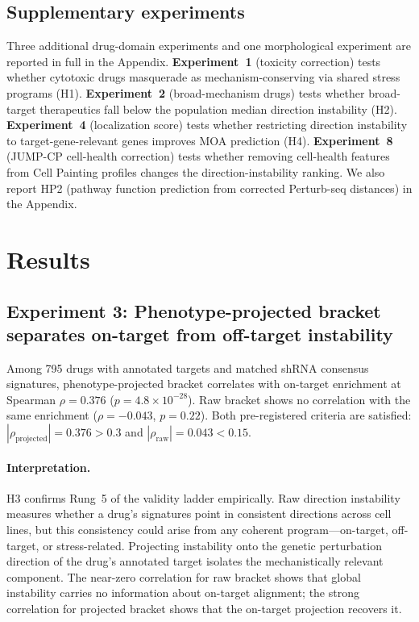 \documentclass{article}
\begin{document}
\subsection{Supplementary experiments}

Three additional drug-domain experiments and one morphological experiment
are reported in full in the Appendix.
\textbf{Experiment~1} (toxicity correction) tests whether cytotoxic drugs
masquerade as mechanism-conserving via shared stress programs (H1).
\textbf{Experiment~2} (broad-mechanism drugs) tests whether broad-target
therapeutics fall below the population median direction instability (H2).
\textbf{Experiment~4} (localization score) tests whether restricting
direction instability to target-gene-relevant genes improves MOA prediction
(H4).
\textbf{Experiment~8} (JUMP-CP cell-health correction) tests whether
removing cell-health features from Cell Painting profiles changes the
direction-instability ranking.
We also report HP2 (pathway function prediction from corrected Perturb-seq
distances) in the Appendix.

\section{Results}

\subsection{Experiment 3: Phenotype-projected bracket separates on-target from off-target instability}

Among 795 drugs with annotated targets and matched shRNA consensus signatures,
phenotype-projected bracket correlates with on-target enrichment at Spearman
$\rho = 0.376$ ($p = 4.8 \times 10^{-28}$). Raw bracket shows no correlation
with the same enrichment ($\rho = -0.043$, $p = 0.22$). Both pre-registered
criteria are satisfied: $|\rho_{\text{projected}}| = 0.376 > 0.3$ and
$|\rho_{\text{raw}}| = 0.043 < 0.15$.

\paragraph{Interpretation.}
H3 confirms Rung~5 of the validity ladder empirically. Raw direction
instability measures whether a drug's signatures point in consistent
directions across cell lines, but this consistency could arise from any
coherent program---on-target, off-target, or stress-related. Projecting
instability onto the genetic perturbation direction of the drug's annotated
target isolates the mechanistically relevant component. The near-zero
correlation for raw bracket shows that global instability carries no
information about on-target alignment; the strong correlation for projected
bracket shows that the on-target projection recovers it.
\end{document}
